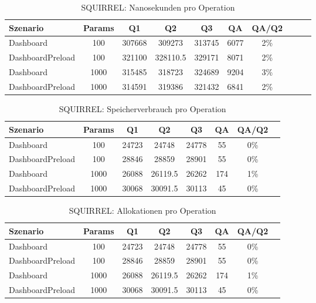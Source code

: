
\begin{table}[ht]
\centering
\caption{SQUIRREL: Nanosekunden pro Operation}
\begin{tabular}{lccccccccc}
\toprule
Szenario & Params & Q1 & Q2 & Q3 & QA & QA/Q2 \\
\midrule
	Dashboard & 100 & 307668 & 309273 & 313745 & 6077 & 2\% \\
	DashboardPreload & 100 & 321100 & 328110.5 & 329171 & 8071 & 2\% \\
	Dashboard & 1000 & 315485 & 318723 & 324689 & 9204 & 3\% \\
	DashboardPreload & 1000 & 314591 & 319386 & 321432 & 6841 & 2\% \\
\bottomrule
\end{tabular}
\label{tab:benchmark_squirrel_nsperop}
\end{table}
	
\begin{table}[ht]
\centering
\caption{SQUIRREL: Speicherverbrauch pro Operation}
\begin{tabular}{lccccccc}
\toprule
Szenario & Params & Q1 & Q2 & Q3 & QA & QA/Q2 \\
\midrule
	Dashboard & 100 & 24723 & 24748 & 24778 & 55 & 0\% \\
	DashboardPreload & 100 & 28846 & 28859 & 28901 & 55 & 0\% \\
	Dashboard & 1000 & 26088 & 26119.5 & 26262 & 174 & 1\% \\
	DashboardPreload & 1000 & 30068 & 30091.5 & 30113 & 45 & 0\% \\
\bottomrule
\end{tabular}
\label{tab:benchmark_squirrel_bytesperop}
\end{table}
	
\begin{table}[ht]
\centering
\caption{SQUIRREL: Allokationen pro Operation}
\begin{tabular}{lccccccc}
\toprule
Szenario & Params & Q1 & Q2 & Q3 & QA & QA/Q2 \\
\midrule
	Dashboard & 100 & 24723 & 24748 & 24778 & 55 & 0\% \\
	DashboardPreload & 100 & 28846 & 28859 & 28901 & 55 & 0\% \\
	Dashboard & 1000 & 26088 & 26119.5 & 26262 & 174 & 1\% \\
	DashboardPreload & 1000 & 30068 & 30091.5 & 30113 & 45 & 0\% \\
\bottomrule
\end{tabular}
\label{tab:benchmark_squirrel_allocsperop}
\end{table}
	
